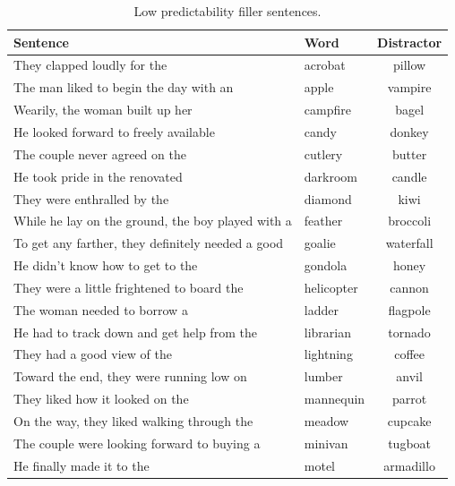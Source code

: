 \begin{table}[!ht]
\caption{Low predictability filler sentences.}
\label{tbl:sentlowfiller}
\small
\centering
\begin{tabular}{llc}
\toprule
Sentence                                                                     & Word        & Distractor  \\
\midrule
They clapped loudly for the                       & acrobat    & pillow      \\
The man liked to begin the day with an            & apple      & vampire     \\
Wearily, the woman built up her                   & campfire   & bagel       \\
He looked forward to freely available             & candy      & donkey      \\
The couple never agreed on the                    & cutlery    & butter      \\
He took pride in the renovated                    & darkroom   & candle      \\
They were enthralled by the                       & diamond    & kiwi        \\
While he lay on the ground, the boy played with a & feather    & broccoli    \\
To get any farther, they definitely needed a good & goalie     & waterfall   \\
He didn't know how to get to the                  & gondola    & honey       \\
They were a little frightened to board the        & helicopter & cannon      \\
The woman needed to borrow a                      & ladder     & flagpole    \\
He had to track down and get help from the        & librarian  & tornado     \\
They had a good view of the                       & lightning  & coffee      \\
Toward the end, they were running low on          & lumber     & anvil       \\
They liked how it looked on the                   & mannequin  & parrot      \\
On the way, they liked walking through the        & meadow     & cupcake     \\
The couple were looking forward to buying a       & minivan    & tugboat     \\
He finally made it to the                         & motel      & armadillo   \\

\end{tabular}
\end{table}
